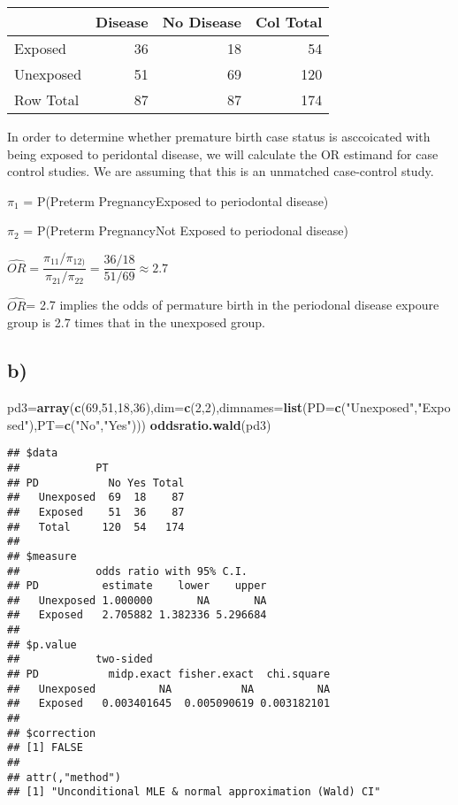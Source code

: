 \documentclass[]{article}
\newenvironment{Shaded}{\begin{snugshade}}{\end{snugshade}}
\newcommand{\KeywordTok}[1]{\textcolor[rgb]{0.13,0.29,0.53}{\textbf{#1}}}
\newcommand{\DataTypeTok}[1]{\textcolor[rgb]{0.13,0.29,0.53}{#1}}
\newcommand{\DecValTok}[1]{\textcolor[rgb]{0.00,0.00,0.81}{#1}}
\newcommand{\StringTok}[1]{\textcolor[rgb]{0.31,0.60,0.02}{#1}}
\newcommand{\NormalTok}[1]{#1}
\begin{document}
\begin{longtable}[]{@{}lrrr@{}}
\toprule
& Disease & No Disease & Col Total\tabularnewline
\midrule
\endhead
Exposed & 36 & 18 & 54\tabularnewline
Unexposed & 51 & 69 & 120\tabularnewline
Row Total & 87 & 87 & 174\tabularnewline
\bottomrule
\end{longtable}

In order to determine whether premature birth case status is asccoicated
with being exposed to peridontal disease, we will calculate the OR
estimand for case control studies. We are assuming that this is an
unmatched case-control study.

\(\pi_1\) = P(Preterm Pregnancy\textbar{}Exposed to periodontal disease)

\(\pi_2\) = P(Preterm Pregnancy\textbar{}Not Exposed to periodonal
disease)

\(\hat{OR} = \dfrac{\pi_{11}/\pi_{12)}}{\pi_{21}/\pi_{22}}=\dfrac{36/18}{51/69}\approx 2.7\)

\(\hat{OR}\)= 2.7 implies the odds of permature birth in the periodonal
disease expoure group is 2.7 times that in the unexposed group.

\subsection{b)}\label{b-1}

\begin{Shaded}
\begin{Highlighting}[]
\NormalTok{pd3=}\KeywordTok{array}\NormalTok{(}\KeywordTok{c}\NormalTok{(}\DecValTok{69}\NormalTok{,}\DecValTok{51}\NormalTok{,}\DecValTok{18}\NormalTok{,}\DecValTok{36}\NormalTok{),}\DataTypeTok{dim=}\KeywordTok{c}\NormalTok{(}\DecValTok{2}\NormalTok{,}\DecValTok{2}\NormalTok{),}\DataTypeTok{dimnames=}\KeywordTok{list}\NormalTok{(}\DataTypeTok{PD=}\KeywordTok{c}\NormalTok{(}\StringTok{"Unexposed"}\NormalTok{,}\StringTok{"Exposed"}\NormalTok{),}\DataTypeTok{PT=}\KeywordTok{c}\NormalTok{(}\StringTok{"No"}\NormalTok{,}\StringTok{"Yes"}\NormalTok{)))}
\KeywordTok{oddsratio.wald}\NormalTok{(pd3)}
\end{Highlighting}
\end{Shaded}

\begin{verbatim}
## $data
##            PT
## PD           No Yes Total
##   Unexposed  69  18    87
##   Exposed    51  36    87
##   Total     120  54   174
## 
## $measure
##            odds ratio with 95% C.I.
## PD          estimate    lower    upper
##   Unexposed 1.000000       NA       NA
##   Exposed   2.705882 1.382336 5.296684
## 
## $p.value
##            two-sided
## PD           midp.exact fisher.exact  chi.square
##   Unexposed          NA           NA          NA
##   Exposed   0.003401645  0.005090619 0.003182101
## 
## $correction
## [1] FALSE
## 
## attr(,"method")
## [1] "Unconditional MLE & normal approximation (Wald) CI"
\end{verbatim}
\end{document}

